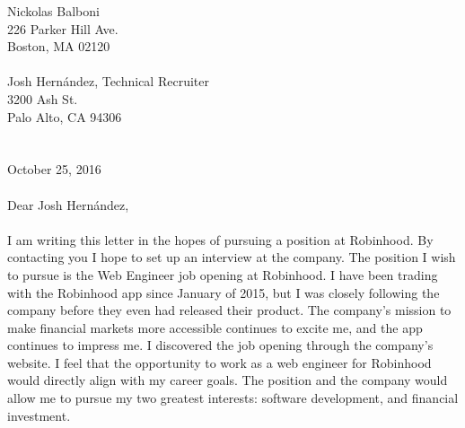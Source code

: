 \documentclass[]{resume}
\begin{document}
	
%
%
\vspace*{\fill}  %
\hspace{-6mm} %
Nickolas Balboni  \\
226 Parker Hill Ave.  \\
Boston, MA 02120  \\
\\
Josh Hern\'{a}ndez, Technical Recruiter \\
3200 Ash St.  \\
Palo Alto, CA 94306  \\
\\~\\
October 25, 2016  \\
\\
Dear Josh Hern\'{a}ndez,  \\
\\

I am writing this letter in the hopes of pursuing a position at Robinhood.  By contacting you I hope to set up an interview at the company.  The position I wish to pursue is the Web Engineer job opening at Robinhood.  I have been trading with the Robinhood app since January of 2015, but I was closely following the company before they even had released their product.  The company's mission to make financial markets more accessible continues to excite me, and the app continues to impress me.  I discovered the job opening through the company's website.  I feel that the opportunity to work as a web engineer for Robinhood would directly align with my career goals.  The position and the company would allow me to pursue my two greatest interests:  software development, and financial investment.  \\
\\
\end{document}
